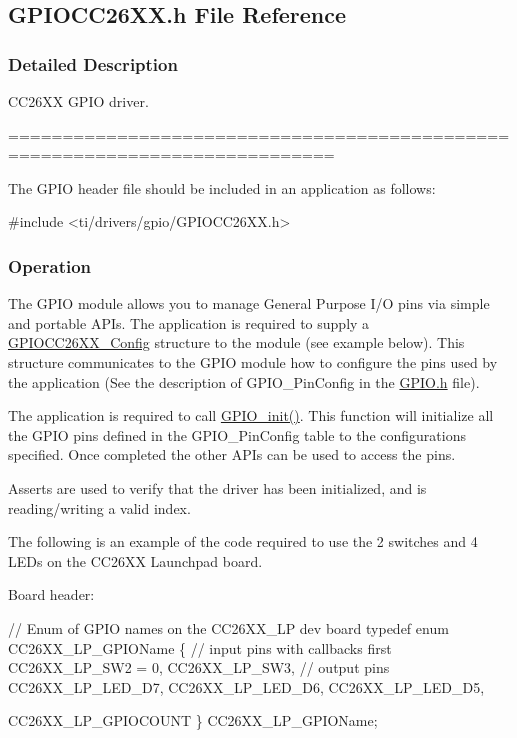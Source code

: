 \subsection{G\+P\+I\+O\+C\+C26\+X\+X.\+h File Reference}
\label{_g_p_i_o_c_c26_x_x_8h}


\subsubsection{Detailed Description}
C\+C26\+X\+X G\+P\+I\+O driver. 

============================================================================

The G\+P\+I\+O header file should be included in an application as follows\+: 
\begin{DoxyCode}
\textcolor{preprocessor}{#include <ti/drivers/gpio/GPIOCC26XX.h>}
\end{DoxyCode}


\subsubsection*{Operation}

The G\+P\+I\+O module allows you to manage General Purpose I/\+O pins via simple and portable A\+P\+Is. The application is required to supply a \hyperlink{struct_g_p_i_o_c_c26_x_x___config}{G\+P\+I\+O\+C\+C26\+X\+X\+\_\+\+Config} structure to the module (see example below). This structure communicates to the G\+P\+I\+O module how to configure the pins used by the application (See the description of G\+P\+I\+O\+\_\+\+Pin\+Config in the \hyperlink{_g_p_i_o_8h}{G\+P\+I\+O.\+h} file).

The application is required to call \hyperlink{_g_p_i_o_8h_a7aaec489dca5ac4d278d2eb3ae38a2d2}{G\+P\+I\+O\+\_\+init()}. This function will initialize all the G\+P\+I\+O pins defined in the G\+P\+I\+O\+\_\+\+Pin\+Config table to the configurations specified. Once completed the other A\+P\+Is can be used to access the pins.

Asserts are used to verify that the driver has been initialized, and is reading/writing a valid index.

The following is an example of the code required to use the 2 switches and 4 L\+E\+Ds on the C\+C26\+X\+X Launchpad board.

Board header\+: 
\begin{DoxyCode}
\textcolor{comment}{// Enum of GPIO names on the CC26XX\_LP dev board}
\textcolor{keyword}{typedef} \textcolor{keyword}{enum} CC26XX\_LP\_GPIOName \{
    \textcolor{comment}{// input pins with callbacks first}
    CC26XX\_LP\_SW2 = 0,
    CC26XX\_LP\_SW3,
    \textcolor{comment}{// output pins}
    CC26XX\_LP\_LED\_D7,
    CC26XX\_LP\_LED\_D6,
    CC26XX\_LP\_LED\_D5,

    CC26XX\_LP\_GPIOCOUNT
\} CC26XX\_LP\_GPIOName;
\end{DoxyCode}


